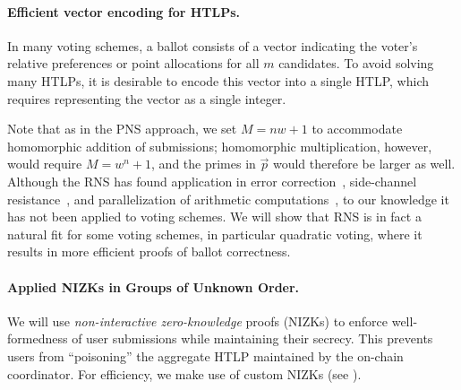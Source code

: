 \paragraph{Efficient vector encoding for HTLPs.}
In many voting schemes, a ballot consists of a vector indicating the voter's relative preferences or point allocations for all $m$ candidates. To avoid solving many HTLPs, it is desirable to encode this vector into a single HTLP, which requires representing the vector as a single integer. %

Note that as in the PNS approach, we set $M = nw + 1$ to accommodate homomorphic addition of submissions; homomorphic multiplication, however, would require $M = w^n+1$, and the primes in $\vec{p}$ would therefore be larger as well.
Although the RNS has found application in error correction~\cite{KPTOC22,TaiCha14}, side-channel resistance~\cite{TCHES:PFPB18}, and parallelization of arithmetic computations~\cite{AsiHosKon17,BajDuqMel06,GomTyaNam11,VNLVC20}, to our knowledge it has not been applied to voting schemes. We will show that RNS is in fact a natural fit for some voting schemes, in particular quadratic voting, where it results in more efficient proofs of ballot correctness. 

\paragraph{Applied NIZKs in Groups of Unknown Order.}
We will use \emph{non-interactive zero-knowledge} proofs (NIZKs) to enforce well-formedness of user submissions while maintaining their secrecy. This prevents users from ``poisoning'' the aggregate HTLP maintained by the on-chain coordinator. For efficiency, we make use of custom NIZKs (see ).



